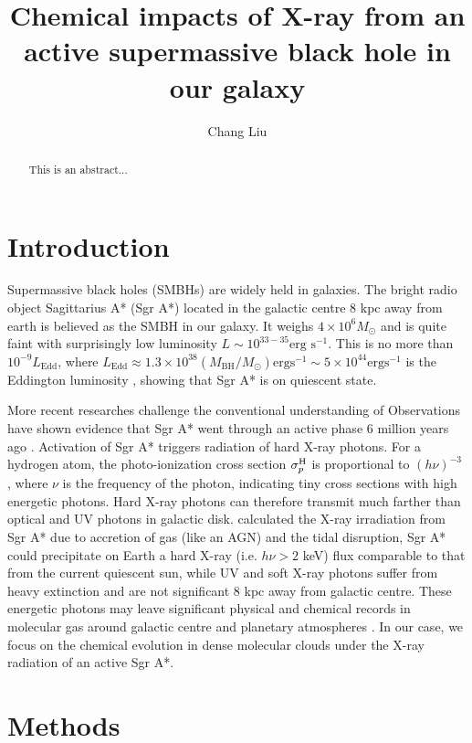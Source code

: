 \documentclass{aastex62}
\begin{document}
	\title{Chemical impacts of X-ray from an active supermassive black hole in our galaxy}
	\author{Chang Liu}
	\begin{abstract}
		This is an abstract...
	\end{abstract}
	\section{Introduction}
	
	Supermassive black holes (SMBHs) are widely held in galaxies. The bright radio object Sagittarius A* (Sgr A*) located in the galactic centre 8 kpc away from earth is believed as the SMBH in our galaxy. It weighs 
	$4\times10^{6}M_\odot$ and is quite faint with surprisingly low luminosity $L\sim10^{33-35}\text{erg s}^{-1}$. This is no more 
	than $10^{-9}L_{\text{Edd}}$, where $L_{\mathrm{Edd}} \approx 1.3 \times 10^{38}\left(M_{\mathrm{BH}} / M_{\odot}\right) \text{erg} 
	\mathrm{s}^{-1}\sim 5\times10^{44} \text{erg} \mathrm{s}^{-1}$ is the Eddington luminosity \citep{Sabha2010}, showing that Sgr A* is on quiescent state. 
	
	More recent researches challenge the conventional understanding of Observations have shown evidence that Sgr A* went through an active phase 6 million years ago \citep{Nicastro2016}. Activation of Sgr A* triggers radiation of hard X-ray photons. For a hydrogen atom, the photo-ionization cross section $\sigma_p^{\ce{H}}$ is proportional to $(h\nu)^{-3}$ \citep{Brown1970}, where $\nu$ is the frequency of the photon, indicating tiny cross sections with high energetic photons. Hard X-ray photons can therefore transmit much farther than optical and UV photons in galactic disk. \cite{Amaro-Seoane2014} calculated the X-ray irradiation from Sgr A* due to accretion of gas (like an AGN) and the tidal disruption, Sgr A* could precipitate on Earth a hard X-ray (i.e. $h\nu > 2$ keV) flux comparable to that from the current quiescent sun, while UV and soft X-ray photons suffer from heavy extinction and are not significant 8 kpc away from galactic centre. These energetic photons may leave significant physical and chemical records in molecular gas around galactic centre\citep{Krolik1983, Neufeld1994, Aalto2014} and planetary atmospheres \citep{Loeb2018,Wis2019}.
	In our case, we focus on the chemical evolution in dense molecular clouds under the X-ray radiation of an active Sgr A*. 
	\section{Methods}
\end{document}
